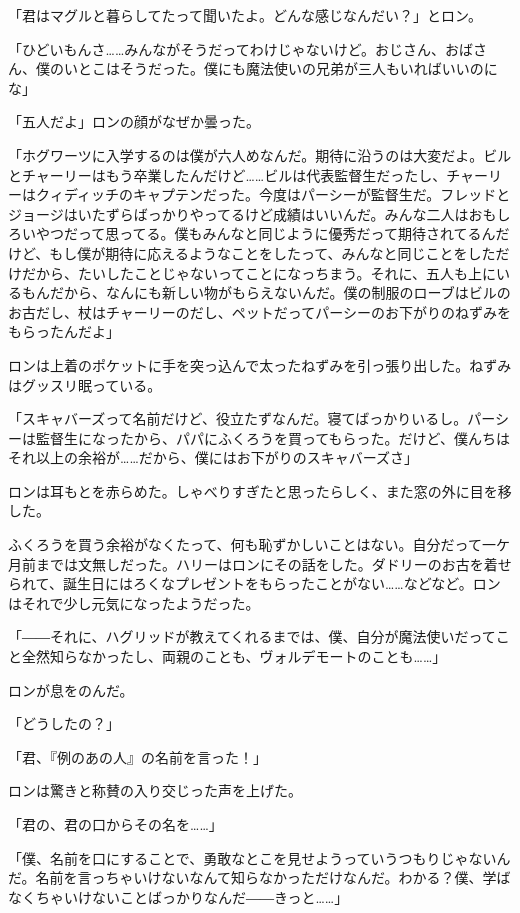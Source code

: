 \documentclass[10pt,a4paper]{article}
\begin{document}
\begin{CJK}{UTF8}{min}
「君はマグルと暮らしてたって聞いたよ。どんな感じなんだい？」とロン。

「ひどいもんさ……みんながそうだってわけじゃないけど。おじさん、おばさん、僕のいとこはそうだった。僕にも魔法使いの兄弟が三人もいればいいのにな」

「五人だよ」ロンの顔がなぜか曇った。

「ホグワーツに入学するのは僕が六人めなんだ。期待に沿うのは大変だよ。ビルとチャーリーはもう卒業したんだけど……ビルは代表監督生だったし、チャーリーはクィディッチのキャプテンだった。今度はパーシーが監督生だ。フレッドとジョージはいたずらばっかりやってるけど成績はいいんだ。みんな二人はおもしろいやつだって思ってる。僕もみんなと同じように優秀だって期待されてるんだけど、もし僕が期待に応えるようなことをしたって、みんなと同じことをしただけだから、たいしたことじゃないってことになっちまう。それに、五人も上にいるもんだから、なんにも新しい物がもらえないんだ。僕の制服のローブはビルのお古だし、杖はチャーリーのだし、ペットだってパーシーのお下がりのねずみをもらったんだよ」

ロンは上着のポケットに手を突っ込んで太ったねずみを引っ張り出した。ねずみはグッスリ眠っている。

「スキャバーズって名前だけど、役立たずなんだ。寝てばっかりいるし。パーシーは監督生になったから、パパにふくろうを買ってもらった。だけど、僕んちはそれ以上の余裕が……だから、僕にはお下がりのスキャバーズさ」

ロンは耳もとを赤らめた。しゃべりすぎたと思ったらしく、また窓の外に目を移した。

ふくろうを買う余裕がなくたって、何も恥ずかしいことはない。自分だって一ケ月前までは文無しだった。ハリーはロンにその話をした。ダドリーのお古を着せられて、誕生日にはろくなプレゼントをもらったことがない……などなど。ロンはそれで少し元気になったようだった。

「――それに、ハグリッドが教えてくれるまでは、僕、自分が魔法使いだってこと全然知らなかったし、両親のことも、ヴォルデモートのことも……」

ロンが息をのんだ。

「どうしたの？」

「君、『例のあの人』の名前を言った！」

ロンは驚きと称賛の入り交じった声を上げた。

「君の、君の口からその名を……」

「僕、名前を口にすることで、勇敢なとこを見せようっていうつもりじゃないんだ。名前を言っちゃいけないなんて知らなかっただけなんだ。わかる？僕、学ばなくちゃいけないことばっかりなんだ――きっと……」


\end{CJK}
\end{document}

